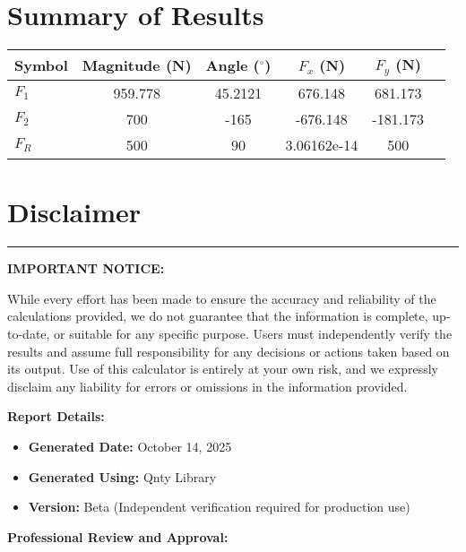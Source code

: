 \documentclass[11pt,a4paper]{article}
\begin{document}
\section{Summary of Results}

\begin{longtable}{lSSSSS}
\toprule
Symbol & {Magnitude (N)} & {Angle ($^\circ$)} & {$F_x$ (N)} & {$F_y$ (N)} \\
\midrule
\endhead
$F_{1}$ & 959.778 & 45.2121 & 676.148 & 681.173 \\
$F_{2}$ & 700 & -165 & -676.148 & -181.173 \\
$F_{R}$ & 500 & 90 & 3.06162e-14 & 500 \\
\bottomrule
\end{longtable}


\clearpage

\section*{Disclaimer}

\begin{center}
\rule{\textwidth}{0.4pt}
\end{center}

\noindent\textbf{IMPORTANT NOTICE:}

\noindent While every effort has been made to ensure the accuracy and reliability of the calculations provided, we do not guarantee that the information is complete, up-to-date, or suitable for any specific purpose. Users must independently verify the results and assume full responsibility for any decisions or actions taken based on its output. Use of this calculator is entirely at your own risk, and we expressly disclaim any liability for errors or omissions in the information provided.

\vspace{1em}

\noindent\textbf{Report Details:}
\begin{itemize}
\item \textbf{Generated Date:} October 14, 2025
\item \textbf{Generated Using:} Qnty Library
\item \textbf{Version:} Beta (Independent verification required for production use)
\end{itemize}

\vspace{2em}

\noindent\textbf{Professional Review and Approval:}
\end{document}
